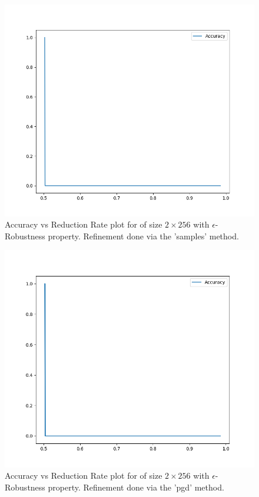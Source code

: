 \begin{figure}
    \includegraphics[scale=0.4]{figs/mnist_2_256_prop_0_0.03_samples.png}
    \caption{Accuracy vs Reduction Rate plot for \mnist of size $2 \times 256$
        with $\epsilon$-Robustness property. Refinement done via the 'samples'
    method.}
    \label{f:mnist-prop-samples}
\end{figure}
\begin{figure}
    \includegraphics[scale=0.4]{figs/mnist_2_256_prop_0_0.03_pgd.png}
    \caption{Accuracy vs Reduction Rate plot for \mnist of size $2 \times 256$
        with $\epsilon$-Robustness property. Refinement done via the 'pgd'
    method.}
    \label{f:mnist-prop-pgd}
\end{figure}

